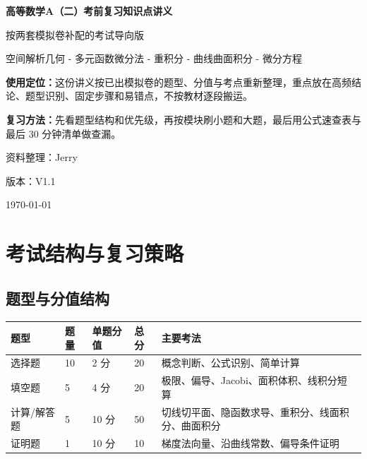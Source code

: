 \documentclass[UTF8,zihao=-4]{ctexart}
\begin{document}
\begin{titlepage}
\centering
\vspace*{2.3cm}
{\Huge\bfseries\sffamily 高等数学A（二）考前复习知识点讲义\par}
\vspace{0.75cm}
{\Large 按两套模拟卷补配的考试导向版\par}
\vspace{0.45cm}
{\large 空间解析几何 - 多元函数微分法 - 重积分 - 曲线曲面积分 - 微分方程\par}
\vfill
\begin{tcolorbox}[colback=lightblue,colframe=mainblue,width=0.86\textwidth,arc=2mm]
\textbf{使用定位：}这份讲义按已出模拟卷的题型、分值与考点重新整理，重点放在高频结论、题型识别、固定步骤和易错点，不按教材逐段搬运。\par
\textbf{复习方法：}先看题型结构和优先级，再按模块刷小题和大题，最后用公式速查表与最后 30 分钟清单做查漏。
\end{tcolorbox}
\vfill
{\large 资料整理：Jerry\par}
{\large 版本：V1.1\par}
{\large \today\par}
\end{titlepage}
\tableofcontents
\newpage

\section{考试结构与复习策略}

\subsection{题型与分值结构}

\begin{longtable}{p{}p{}p{}p{}p{}}
\toprule
\textbf{题型} & \textbf{题量} & \textbf{单题分值} & \textbf{总分} & \textbf{主要考法} \\
\midrule
选择题 & 10 & 2 分 & 20 & 概念判断、公式识别、简单计算 \\
填空题 & 5 & 4 分 & 20 & 极限、偏导、Jacobi、面积体积、线积分短算 \\
计算/解答题 & 5 & 10 分 & 50 & 切线切平面、隐函数求导、重积分、线面积分、曲面积分 \\
证明题 & 1 & 10 分 & 10 & 梯度法向量、沿曲线常数、偏导条件证明 \\
\bottomrule
\end{longtable}
\end{document}
